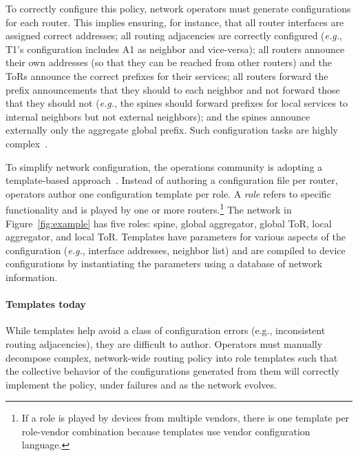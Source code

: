 \documentclass{sig-alternate-10pt}
\newcommand{\EG}{\emph{e.g.}}
\newcommand{\para}[1]{\paragraph*{\textbf{#1}}}
\begin{document}
To correctly configure this policy, network operators must generate configurations for each router. This implies ensuring, for instance, that all router interfaces are assigned correct addresses; all routing adjacencies are correctly configured (\EG, T1's configuration includes A1 as neighbor and vice-versa); all routers announce their own addresses (so that they can be reached from other routers) and the ToRs announce the correct prefixes for their services; all routers  forward the prefix announcements that they should to each neighbor and not forward those that they should not (\EG, the spines should forward prefixes for local services to internal neighbors but not external neighbors); and the spines announce externally only the aggregate global prefix. Such configuration tasks are highly complex~\cite{juniper-study,bgpmon,batfish,propane}.

To simplify network configuration, the operations community is adopting a template-based approach~\cite{hatch,thwack}. Instead of authoring a configuration file per router, operators author one configuration template per role.
%
A {\em role} refers to specific functionality and is played by one or more routers.\footnote{If a role is played by devices from multiple vendors, there is one template per role-vendor combination because templates use vendor configuration language.}
%
The network in Figure~\ref{fig:example} has five roles: spine, global aggregator, global ToR, local aggregator, and local ToR.
%
Templates have parameters for various aspects of the configuration (\EG, interface addresses, neighbor list) and are compiled to device configurations by instantiating the parameters using a database of network information.


\para{Templates today} While templates help avoid a class of configuration errors (e.g., inconsistent routing adjacencies), they are difficult to author. Operators must manually decompose complex, network-wide routing policy into role templates such that the collective behavior of the configurations generated from them will correctly implement the policy, under failures and as the network evolves.
\end{document}
